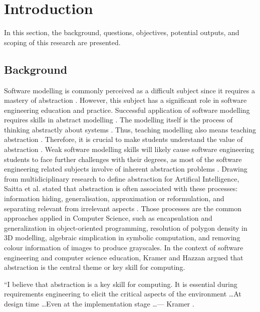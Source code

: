 \documentclass[12pt, a4paper]{report} \usepackage[titletoc]{appendix}
\begin{document}
\chapter{Introduction}
\label{Introduction}
In this section, the background, questions, objectives, potential outputs, and scoping of this research are presented.

\section{Background}
Software modelling is commonly perceived as a difficult subject since it
requires a mastery of abstraction \cite{Borstler2012}. However, this subject
has a significant role in software engineering education and
practice. Successful application of software modelling requires skills in
abstract modelling \cite{whittle2013industrial}. The modelling itself is the
process of thinking abstractly about systems \cite{bezivin2009teaching}. Thus,
teaching modelling also means teaching abstraction \cite{engels2005teaching}.
Therefore, it is crucial to make students understand the value of abstraction
\cite{bezivin2009teaching}. Weak software modelling skills will likely cause
software engineering students to face further challenges with their degrees, as
most of the software engineering related subjects involve of inherent
abstraction problems \cite{Kramer2007}. Drawing from multidiciplinary research to define abstraction for Artifical Intelligence, Saitta et al. stated that abstraction is often associated with these processes: information hiding, generalisation, approximation or reformulation, and separating relevant from irrelevant aspects \cite{Saitta2013}. Those processes are the common approaches applied in Computer Science, such as encapsulation and generalization in object-oriented programming, resolution of polygon density in 3D modelling, algebraic simplication in symbolic computation, and removing colour information of images to produce grayscales. In the context of software engineering and computer science education, Kramer \cite{Kramer2007} and Hazzan \cite{hazzan2008reflections} argued that abstraction is the central theme or key
skill for computing.

\begin{displayquote}
``I believe that abstraction is a key skill for computing. It is essential
during requirements engineering to elicit the critical aspects of the 
environment \dots At design time \dots Even at the implementation stage
\dots --- Kramer \cite{Kramer2007}.
\end{displayquote}
\end{document}
